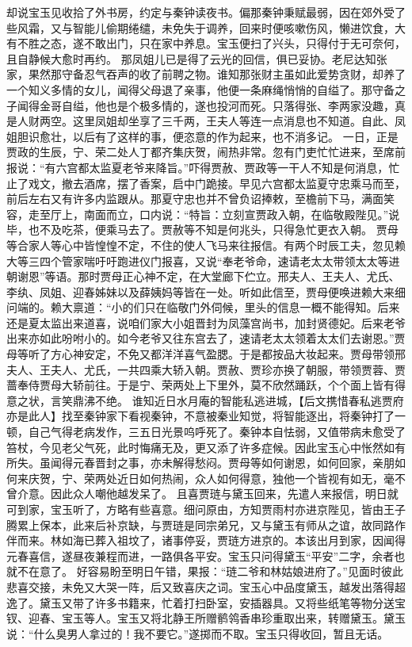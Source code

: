 \documentclass[12pt,oneside]{book}
\begin{document}
却说宝玉见收拾了外书房，约定与秦钟读夜书。偏那秦钟秉赋最弱，因在郊外受了些风霜，又与智能儿偷期绻缱，未免失于调养，回来时便咳嗽伤风，懒进饮食，大有不胜之态，遂不敢出门，只在家中养息。宝玉便扫了兴头，只得付于无可奈何，且自静候大愈时再约。
那凤姐儿已是得了云光的回信，俱已妥协。老尼达知张家，果然那守备忍气吞声的收了前聘之物。谁知那张财主虽如此爱势贪财，却养了一个知义多情的女儿，闻得父母退了亲事，他便一条麻绳悄悄的自缢了。那守备之子闻得金哥自缢，他也是个极多情的，遂也投河而死。只落得张、李两家没趣，真是人财两空。这里凤姐却坐享了三千两，王夫人等连一点消息也不知道。自此、凤姐胆识愈壮，以后有了这样的事，便恣意的作为起来，也不消多记。
一日，正是贾政的生辰，宁、荣二处人丁都齐集庆贺，闹热非常。忽有门吏忙忙进来，至席前报说：“有六宫都太监夏老爷来降旨。”吓得贾赦、贾政等一干人不知是何消息，忙止了戏文，撤去酒席，摆了香案，启中门跪接。早见六宫都太监夏守忠乘马而至，前后左右又有许多内监跟从。那夏守忠也并不曾负诏捧敕，至檐前下马，满面笑容，走至厅上，南面而立，口内说：“特旨：立刻宣贾政入朝，在临敬殿陛见。”说毕，也不及吃茶，便乘马去了。贾赦等不知是何兆头，只得急忙更衣入朝。
贾母等合家人等心中皆惶惶不定，不住的使人飞马来往报信。有两个时辰工夫，忽见赖大等三四个管家喘吁吁跑进仪门报喜，又说“奉老爷命，速请老太太带领太太等进朝谢恩”等语。那时贾母正心神不定，在大堂廊下伫立。邢夫人、王夫人、尤氏、李纨、凤姐、迎春姊妹以及薛姨妈等皆在一处。听如此信至，贾母便唤进赖大来细问端的。赖大禀道：“小的们只在临敬门外伺候，里头的信息一概不能得知。后来还是夏太监出来道喜，说咱们家大小姐晋封为凤藻宫尚书，加封贤德妃。后来老爷出来亦如此吩咐小的。如今老爷又往东宫去了，速请老太太领着太太们去谢恩。”贾母等听了方心神安定，不免又都洋洋喜气盈腮。于是都按品大妆起来。贾母带领邢夫人、王夫人、尤氏，一共四乘大轿入朝。贾赦、贾珍亦换了朝服，带领贾蓉、贾蔷奉侍贾母大轿前往。于是宁、荣两处上下里外，莫不欣然踊跃，个个面上皆有得意之状，言笑鼎沸不绝。
谁知近日水月庵的智能私逃进城，【后文携惜春私逃贾府亦是此人】找至秦钟家下看视秦钟，不意被秦业知觉，将智能逐出，将秦钟打了一顿，自己气得老病发作，三五日光景呜呼死了。秦钟本自怯弱，又值带病未愈受了笞杖，今见老父气死，此时悔痛无及，更又添了许多症候。因此宝玉心中怅然如有所失。虽闻得元春晋封之事，亦未解得愁闷。贾母等如何谢恩，如何回家，亲朋如何来庆贺，宁、荣两处近日如何热闹，众人如何得意，独他一个皆视有如无，毫不曾介意。因此众人嘲他越发呆了。
且喜贾琏与黛玉回来，先遣人来报信，明日就可到家，宝玉听了，方略有些喜意。细问原由，方知贾雨村亦进京陛见，皆由王子腾累上保本，此来后补京缺，与贾琏是同宗弟兄，又与黛玉有师从之谊，故同路作伴而来。林如海已葬入祖坟了，诸事停妥，贾琏方进京的。本该出月到家，因闻得元春喜信，遂昼夜兼程而进，一路俱各平安。宝玉只问得黛玉“平安”二字，余者也就不在意了。
好容易盼至明日午错，果报：“琏二爷和林姑娘进府了。”见面时彼此悲喜交接，未免又大哭一阵，后又致喜庆之词。宝玉心中品度黛玉，越发出落得超逸了。黛玉又带了许多书籍来，忙着打扫卧室，安插器具。又将些纸笔等物分送宝钗、迎春、宝玉等人。宝玉又将北静王所赠鹡鸰香串珍重取出来，转赠黛玉。黛玉说：“什么臭男人拿过的！我不要它。”遂掷而不取。宝玉只得收回，暂且无话。
\end{document}
